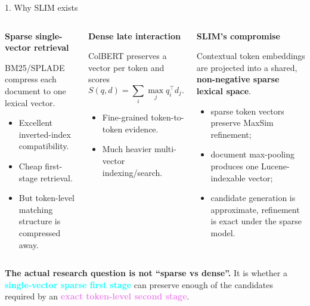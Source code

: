 \documentclass[aspectratio=169,9pt]{beamer}
\newcommand{\hilite}[1]{\textcolor{cyan}{\textbf{#1}}}
\newcommand{\vio}[1]{\textcolor{violet}{\textbf{#1}}}
\begin{document}
\begin{frame}[t]{1. Why SLIM exists}
\begin{columns}[T,totalwidth=\textwidth]
\begin{darkbox}
{\color{amber}\bfseries Sparse single-vector retrieval}\par\smallskip
\small BM25/SPLADE compress each document to one lexical vector.
\begin{itemize}\scriptsize
\item Excellent inverted-index compatibility.
\item Cheap first-stage retrieval.
\item But token-level matching structure is compressed away.
\end{itemize}
\end{darkbox}

\begin{darkbox}
{\color{violet}\bfseries Dense late interaction}\par\smallskip
\small ColBERT preserves a vector per token and scores
\[
S(q,d)=\sum_i\max_j q_i^\top d_j.
\]
\begin{itemize}\scriptsize
\item Fine-grained token-to-token evidence.
\item Much heavier multi-vector indexing/search.
\end{itemize}
\end{darkbox}

\begin{cyanbox}
{\color{cyan}\bfseries SLIM's compromise}\par\smallskip
\small Contextual token embeddings are projected into a shared, \textbf{non-negative sparse lexical space}.
\begin{itemize}\scriptsize
\item sparse token vectors preserve MaxSim refinement;
\item document max-pooling produces one Lucene-indexable vector;
\item candidate generation is approximate, refinement is exact under the sparse model.
\end{itemize}
\end{cyanbox}
\end{columns}
\vspace{0.12cm}
\begin{darkbox}
\small \textbf{The actual research question is not “sparse vs dense”.} It is whether a \hilite{single-vector sparse first stage} can preserve enough of the candidates required by an \vio{exact token-level second stage}.
\end{darkbox}
\end{frame}
\end{document}
